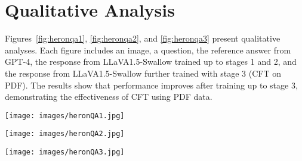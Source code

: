 \section{Qualitative Analysis}\label{supsec:quali}
Figures~\ref{fig:heronqa1}, \ref{fig:heronqa2}, and \ref{fig:heronqa3} present qualitative analyses. Each figure includes an image, a question, the reference answer from GPT-4, the response from LLaVA1.5-Swallow trained up to stages 1 and 2, and the response from LLaVA1.5-Swallow further trained with stage 3 (CFT on PDF). The results show that performance improves after training up to stage 3, demonstrating the effectiveness of CFT using PDF data.

\begin{figure*}[t]
  \texttt{[image: images/heronQA1.jpg]}
  \vspace{-4mm}
  \caption{\textbf{Qualitative analysis on Heron-Bench.} 
  Correct parts of the responses are highlighted in green, while incorrect parts are marked in red.}
  \label{fig:heronqa1}
\end{figure*}

\begin{figure*}[t]
  \texttt{[image: images/heronQA2.jpg]}
  \vspace{-4mm}
  \caption{\textbf{Another example of qualitative analysis on Heron-Bench.}}
  \label{fig:heronqa2}
\end{figure*}

\begin{figure*}[t]
  \texttt{[image: images/heronQA3.jpg]}
  \vspace{-4mm}
  \caption{\textbf{Further qualitative analysis on Heron-Bench.}}
  \label{fig:heronqa3}
\end{figure*}